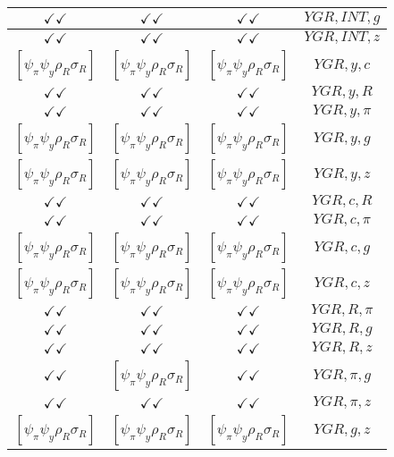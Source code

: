 \documentclass[a4paper,10pt]{article}
\begin{document}
\begin{longtable}{|c|c|c|c|}
\hline
$\checkmark\checkmark$ & $\checkmark\checkmark$ & $\checkmark\checkmark$ & ${YGR},{INT},{g}$ \\
\hline
$\checkmark\checkmark$ & $\checkmark\checkmark$ & $\checkmark\checkmark$ & ${YGR},{INT},{z}$ \\
\hline
$[\psi_\pi \psi_y \rho_R \sigma_R ]$ & $[\psi_\pi \psi_y \rho_R \sigma_R ]$ & $[\psi_\pi \psi_y \rho_R \sigma_R ]$ & ${YGR},{y},{c}$ \\
\hline
$\checkmark\checkmark$ & $\checkmark\checkmark$ & $\checkmark\checkmark$ & ${YGR},{y},{R}$ \\
\hline
$\checkmark\checkmark$ & $\checkmark\checkmark$ & $\checkmark\checkmark$ & ${YGR},{y},{\pi}$ \\
\hline
$[\psi_\pi \psi_y \rho_R \sigma_R ]$ & $[\psi_\pi \psi_y \rho_R \sigma_R ]$ & $[\psi_\pi \psi_y \rho_R \sigma_R ]$ & ${YGR},{y},{g}$ \\
\hline
$[\psi_\pi \psi_y \rho_R \sigma_R ]$ & $[\psi_\pi \psi_y \rho_R \sigma_R ]$ & $[\psi_\pi \psi_y \rho_R \sigma_R ]$ & ${YGR},{y},{z}$ \\
\hline
$\checkmark\checkmark$ & $\checkmark\checkmark$ & $\checkmark\checkmark$ & ${YGR},{c},{R}$ \\
\hline
$\checkmark\checkmark$ & $\checkmark\checkmark$ & $\checkmark\checkmark$ & ${YGR},{c},{\pi}$ \\
\hline
$[\psi_\pi \psi_y \rho_R \sigma_R ]$ & $[\psi_\pi \psi_y \rho_R \sigma_R ]$ & $[\psi_\pi \psi_y \rho_R \sigma_R ]$ & ${YGR},{c},{g}$ \\
\hline
$[\psi_\pi \psi_y \rho_R \sigma_R ]$ & $[\psi_\pi \psi_y \rho_R \sigma_R ]$ & $[\psi_\pi \psi_y \rho_R \sigma_R ]$ & ${YGR},{c},{z}$ \\
\hline
$\checkmark\checkmark$ & $\checkmark\checkmark$ & $\checkmark\checkmark$ & ${YGR},{R},{\pi}$ \\
\hline
$\checkmark\checkmark$ & $\checkmark\checkmark$ & $\checkmark\checkmark$ & ${YGR},{R},{g}$ \\
\hline
$\checkmark\checkmark$ & $\checkmark\checkmark$ & $\checkmark\checkmark$ & ${YGR},{R},{z}$ \\
\hline
$\checkmark\checkmark$ & $[\psi_\pi \psi_y \rho_R \sigma_R ]$ & $\checkmark\checkmark$ & ${YGR},{\pi},{g}$ \\
\hline
$\checkmark\checkmark$ & $\checkmark\checkmark$ & $\checkmark\checkmark$ & ${YGR},{\pi},{z}$ \\
\hline
$[\psi_\pi \psi_y \rho_R \sigma_R ]$ & $[\psi_\pi \psi_y \rho_R \sigma_R ]$ & $[\psi_\pi \psi_y \rho_R \sigma_R ]$ & ${YGR},{g},{z}$ \\

\end{longtable}
\end{document}
